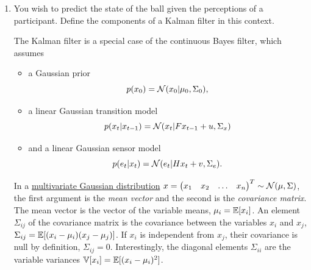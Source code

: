 \documentclass[11pt, a4paper]{article}
\begin{document}
\begin{enumerate}
    \item You wish to predict the state of the ball given the perceptions of a participant. Define the components of a Kalman filter in this context.

    \begin{solution}
        The Kalman filter is a special case of the continuous Bayes filter, which assumes
        \begin{itemize}
            \item a Gaussian prior
            \begin{equation*}
                p(x_0) = \mathcal{N}(x_0 | \mu_0, \Sigma_0),
            \end{equation*}
            \item a linear Gaussian transition model
            \begin{equation*}
                p(x_t | x_{t-1}) = \mathcal{N}(x_t | F x_{t-1} + u, \Sigma_x)
            \end{equation*}
            \item and a linear Gaussian sensor model
            \begin{equation*}
                p(e_t | x_t) = \mathcal{N}(e_t | H x_t + v, \Sigma_e).
            \end{equation*}
        \end{itemize}
        In a \href{https://wikipedia.org/wiki/Multivariate_normal_distribution}{multivariate Gaussian distribution} $x = \begin{pmatrix}x_1 & x_2 & \dots & x_n\end{pmatrix}^T \sim \mathcal{N}(\mu, \Sigma)$, the first argument is the \emph{mean vector} and the second is the \emph{covariance matrix}. The mean vector is the vector of the variable means, \ie{} $\mu_i = \mathbb{E}[x_i]$. An element $\Sigma_{ij}$ of the covariance matrix is the covariance between the variables $x_i$ and $x_j$, \ie{} $\Sigma_{ij} = \mathbb{E}[(x_i - \mu_i) (x_j - \mu_j)]$. If $x_i$ is independent from $x_j$, their covariance is null by definition, \ie{} $\Sigma_{ij} = 0$. Interestingly, the diagonal elements $\Sigma_{ii}$ are the variable variances $\mathbb{V}[x_i] = \mathbb{E}[(x_i - \mu_i)^2]$.


\end{solution}
\end{enumerate}
\end{document}
